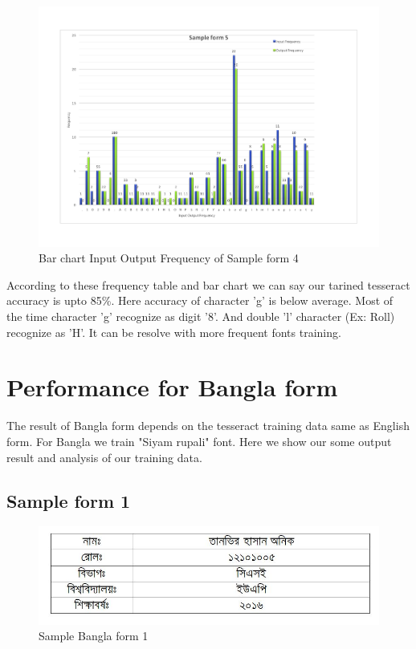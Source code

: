 \begin{figure}[H]
\centering
\includegraphics[width=1\textwidth]{form5.pdf}
\caption {Bar chart Input Output Frequency of Sample form 4}
\label {fig:bar5}
\end{figure}

According to these frequency table and bar chart we can say our tarined tesseract accuracy is upto 85\%. Here accuracy of character 'g' is below average. Most of the time character 'g' recognize as digit '8'. And double 'l' character (Ex: Roll) recognize as 'H'. It can be resolve with more frequent fonts training.

\section{Performance for Bangla form}
The result of Bangla form depends on the tesseract training data same as English form. For Bangla we train "Siyam rupali" font. Here we show our some output result and analysis of our training data.
\subsection{Sample form 1}
\begin{figure}[H]
\centering
\includegraphics[width=1\textwidth]{formBen01.JPG}
\caption {Sample Bangla form 1}
\label {fig:FormBan1}
\end{figure}

